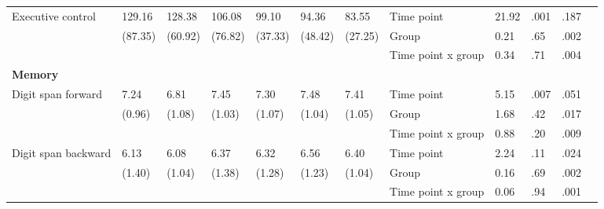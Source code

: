 \documentclass[authordate, empirical]{jote-new-article}
\begin{document}
\begin{table}[t]
\begin{fullwidth}
{\begin{tabular}{@{} l l l l l l l | l l l l l @{}}
        \hline Executive control                       & 129.16                                        & 128.38               & 106.08               & 99.10         & 94.36                                 & 83.55   & Time point         & 21.92 & .001 & .187   \\
                                                       & (87.35)                                       & (60.92)              & (76.82)              & (37.33)       & (48.42)                               & (27.25) & Group              & 0.21  & .65  & .002   \\
                                                       &                                               &                      &                      &               &                                       &         & Time point x group & 0.34  & .71  & .004   \\

        \hline \textbf{Memory}                         &                                               &                      &                      &               &                                       &         &                    &       &      &      & \\

        \hline Digit span forward                      & 7.24                                          & 6.81                 & 7.45                 & 7.30          & 7.48                                  & 7.41    & Time point         & 5.15  & .007 & .051   \\
                                                       & (0.96)                                        & (1.08)               & (1.03)               & (1.07)        & (1.04)                                & (1.05)  & Group              & 1.68  & .42  & .017   \\
                                                       &                                               &                      &                      &               &                                       &         & Time point x group & 0.88  & .20  & .009   \\

        \hline Digit span backward                     & 6.13                                          & 6.08                 & 6.37                 & 6.32          & 6.56                                  & 6.40    & Time point         & 2.24  & .11  & .024   \\
                                                       & (1.40)                                        & (1.04)               & (1.38)               & (1.28)        & (1.23)                                & (1.04)  & Group              & 0.16  & .69  & .002   \\
                                                       &                                               &                      &                      &               &                                       &         & Time point x group & 0.06  & .94  & .001   \\


\end{tabular}}
\end{fullwidth}
\end{table}
\end{document}
